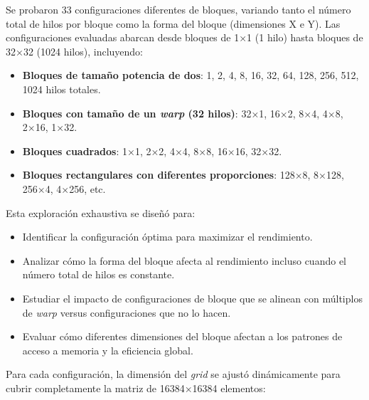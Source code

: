         Se probaron 33 configuraciones diferentes de bloques, variando tanto el número total de hilos por bloque como la forma del bloque (dimensiones X e Y). Las configuraciones evaluadas abarcan desde bloques de 1×1 (1 hilo) hasta bloques de 32×32 (1024 hilos), incluyendo:
        
        \begin{itemize}
        
            \item \textbf{Bloques de tamaño potencia de dos}: 1, 2, 4, 8, 16, 32, 64, 128, 256, 512, 1024 hilos totales.
            
            \item \textbf{Bloques con tamaño de un \textit{warp} (32 hilos)}: 32×1, 16×2, 8×4, 4×8, 2×16, 1×32.
            
            \item \textbf{Bloques cuadrados}: 1×1, 2×2, 4×4, 8×8, 16×16, 32×32.
            
            \item \textbf{Bloques rectangulares con diferentes proporciones}: 128×8, 8×128, 256×4, 4×256, etc.
            
        \end{itemize}
        
        Esta exploración exhaustiva se diseñó para:
        
        \begin{itemize}
        
            \item Identificar la configuración óptima para maximizar el rendimiento.
            
            \item Analizar cómo la forma del bloque afecta al rendimiento incluso cuando el número total de hilos es constante.
            
            \item Estudiar el impacto de configuraciones de bloque que se alinean con múltiplos de \textit{warp} versus configuraciones que no lo hacen.
            
            \item Evaluar cómo diferentes dimensiones del bloque afectan a los patrones de acceso a memoria y la eficiencia global.
            
        \end{itemize}
        
        Para cada configuración, la dimensión del \textit{grid} se ajustó dinámicamente para cubrir completamente la matriz de 16384×16384 elementos:
        
